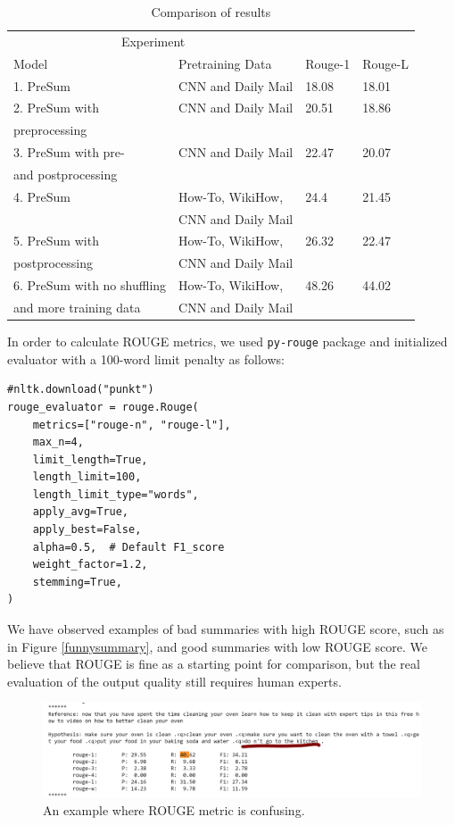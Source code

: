 \documentclass{article}
\begin{document}
\begin{table}
  \caption{Comparison of results}
  \label{table1}
  \centering
  \begin{tabular}{llll}
    \toprule
    \multicolumn{2}{c}{Experiment}                   \\
    \cmidrule(r){1-2}
    Model     & Pretraining Data     & Rouge-1 &Rouge-L\\
    \midrule
   1. PreSum  & CNN  and Daily Mail &18.08 &18.01    \\
 \midrule   
    2. PreSum with     & CNN  and Daily Mail & 20.51 &18.86     \\
      preprocessing    & & \\
\midrule
    3. PreSum with pre-     & CNN  and Daily Mail  & 22.47&20.07  \\
      and postprocessing    & & \\
\midrule
  4. PreSum  & How-To, WikiHow,   & 24.4 &21.45     \\
& CNN  and Daily Mail&\\
\midrule
  5. PreSum with  & How-To, WikiHow, & 26.32 &22.47    \\
postprocessing &CNN  and Daily Mail &\\
\midrule
 6. PreSum with  no shuffling& How-To, WikiHow, & 48.26 &44.02    \\
and more training data &CNN  and Daily Mail &\\
     \bottomrule
  \end{tabular}
\end{table}

In order to calculate ROUGE metrics, we used \verb+py-rouge+ package and initialized evaluator with a 100-word limit penalty as follows:
\begin{verbatim}
#nltk.download("punkt")
rouge_evaluator = rouge.Rouge(
    metrics=["rouge-n", "rouge-l"],
    max_n=4,
    limit_length=True,
    length_limit=100,
    length_limit_type="words",
    apply_avg=True,
    apply_best=False,
    alpha=0.5,  # Default F1_score
    weight_factor=1.2,
    stemming=True,
)
\end{verbatim}

We have observed examples of bad summaries with high ROUGE score, such as in Figure \ref{funnysummary}, and good summaries with low ROUGE score. We believe that ROUGE is fine as a starting point for comparison, but the real evaluation of the output quality still requires human experts.

\begin{figure}
  \includegraphics[width=\linewidth]{pic1.png}
  \caption{An example where ROUGE metric is confusing.}
  \label{fig:funnysummary}
\end{figure}
\end{document}
